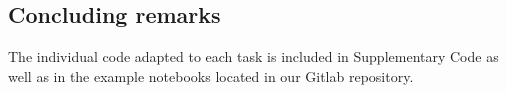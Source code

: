 \subsection{Concluding remarks}


The individual code adapted to each task is included in Supplementary Code as well as in the example notebooks located in our Gitlab repository.

